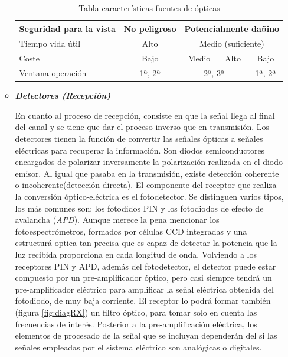 \begin{itemize}
\begin{itemize}
\begin{table}[H]
\begin{tabular}{l|c|c|c|c|}
  				\multicolumn{1}{|l|}{\cellcolor[HTML]{EFEFEF}Seguridad para la vista}          & No peligroso                         & \multicolumn{3}{c|}{Potencialmente dañino}                                                                                  \\ \hline
  				\multicolumn{1}{|l|}{\cellcolor[HTML]{EFEFEF}Tiempo vida útil}                 & Alto                                 & \multicolumn{3}{c|}{Medio (suficiente)}                                                                                     \\ \hline
  				\multicolumn{1}{|l|}{\cellcolor[HTML]{EFEFEF}Coste}                            & Bajo                                 & Medio                                   & Alto                                     & Bajo                                   \\ \hline
  				\multicolumn{1}{|l|}{\cellcolor[HTML]{EFEFEF}Ventana operación}                & 1ª, 2ª                               & \multicolumn{2}{c|}{2ª, 3ª}                                                        & 1ª, 2ª                                 \\ \hline
  			\end{tabular}
  		\caption{Tabla características fuentes de ópticas}
  		\label{tabla:caractFuentes}
  		\end{table}
  	
 		\item \textit{\textbf{Detectores (Recepción)}}
 			
 		En cuanto al proceso de recepción, consiste en que la señal llega al final del canal y se tiene que dar el proceso inverso que en transmisión. Los detectores tienen la función de convertir las señales ópticas a señales eléctricas para recuperar la información. Son diodos semiconductores encargados de polarizar inversamente la polarización realizada en el diodo emisor.  Al igual que pasaba en la transmisión, existe detección coherente o incoherente(detección directa). El componente del receptor que realiza la conversión óptico-eléctrica es el fotodetector. Se distinguen varios tipos, los más comunes son: los fotodidos PIN y los fotodiodos de efecto de avalancha (\textit{APD}). Aunque merece la pena mencionar los fotoespectrómetros, formados por células CCD integradas y una estructurá optica tan precisa que es capaz de detectar la potencia que la luz recibida proporciona en cada longitud de onda. Volviendo a los receptores PIN y APD, además del fotodetector, el detector puede estar compuesto por un pre-amplificador óptico, pero casi siempre tendrá un pre-amplificador eléctrico para amplificar la señal eléctrica obtenida del fotodiodo, de muy baja corriente. El receptor lo podrá formar también (figura \ref{fig:diagRX}) un filtro óptico, para tomar solo en cuenta las frecuencias de interés. Posterior a la pre-amplificación eléctrica, los elementos de procesado de la señal que se incluyan dependerán del si las señales empleadas por el sistema eléctrico son analógicas o digitales.
 		

\end{itemize}
\end{itemize}
